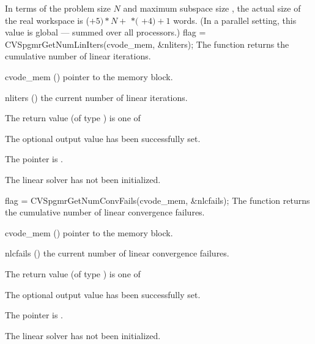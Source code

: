 {
  In terms of the problem size $N$ and maximum subspace size , 
  the actual size of the real workspace is
  ($+ 5)*N +$  $*($ $ + 4) + 1$ 
  words.  (In a parallel setting, this value is global --- summed over
  all processors.)
}
{
  flag = CVSpgmrGetNumLinIters(cvode\_mem, \&nliters);
}
{
  The function  returns the
  cumulative number of linear iterations.
}
{
  \begin{args}
  \item[cvode\_mem] ()
    pointer to the {\cvode} memory block.
  \item[nliters] ()
    the current number of linear iterations.
  \end{args}
}
{
  The return value  (of type ) is one of
  \begin{args}
  \item[\Id{CVSPGMR\_SUCCESS}] 
    The optional output value has been successfully set.
  \item[\Id{CVSPGMR\_MEM\_NULL}]
    The  pointer is .
  \item[\Id{CVSPGMR\_LMEM\_NULL}]
    The {\cvspgmr} linear solver has not been initialized.
  \end{args}
}
{}
{
  flag = CVSpgmrGetNumConvFails(cvode\_mem, \&nlcfails);
}
{
  The function  returns the
  cumulative number of linear convergence failures.
}
{
  \begin{args}
  \item[cvode\_mem] ()
    pointer to the {\cvode} memory block.
  \item[nlcfails] ()
    the current number of linear convergence failures.
  \end{args}
}
{
  The return value  (of type ) is one of
  \begin{args}
  \item[\Id{CVSPGMR\_SUCCESS}] 
    The optional output value has been successfully set.
  \item[\Id{CVSPGMR\_MEM\_NULL}]
    The  pointer is .
  \item[\Id{CVSPGMR\_LMEM\_NULL}]
    The {\cvspgmr} linear solver has not been initialized.
  \end{args}
}
